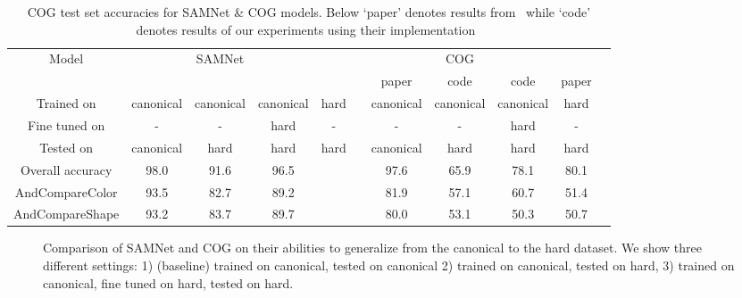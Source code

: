 \begin{table}[t]
\caption{COG test set accuracies for SAMNet \& COG models. Below `paper' denotes results from~\cite{yang2018dataset} 
	while `code' denotes results of our experiments using their implementation~\cite{yang2018implement}}

\centering
\begin{adjustbox}{width=\textwidth}
\begin{tabular}{ccccccccccc}
	\toprule
	Model & & SAMNet & && && COG&& \\
	\cmidrule{2-5} \cmidrule{7-11} 
	&&&&& & paper & code & code & paper&\\
	\cmidrule{7-9} \cmidrule{10-11}
	Trained on       & canonical & canonical & canonical & hard &           &  canonical  & canonical  & canonical & hard \\ 
	Fine tuned on  & - & - & hard  & - &           & -   & - & hard & - \\ 
	Tested on        & canonical & hard & hard & hard &            &canonical  & hard & hard & hard  \\ 
	\midrule	
	Overall accuracy & 98.0 & 91.6 & 96.5  &  &           & 97.6  & 65.9 & 78.1& 80.1 \\ 	
	\midrule 	
	AndCompareColor	&	93.5		&	82.7	&	89.2	& &		&81.9	&57.1&60.7  &	51.4 \\ 
	AndCompareShape	&	93.2 		&	83.7	&	89.7	&&	&	80.0	&53.1	&50.3 &50.7 \\ 
	\bottomrule
\end{tabular}
\end{adjustbox}
\label{tab:results}
\end{table}


\begin{figure}
	\centering
	\caption{Comparison of SAMNet and COG on their abilities to generalize from the canonical to the hard dataset. We show three different settings: 1) (baseline) trained on canonical, tested on canonical 2) trained on canonical, tested on hard, 3) trained on canonical, fine tuned on hard, tested on hard. }
\end{figure}



